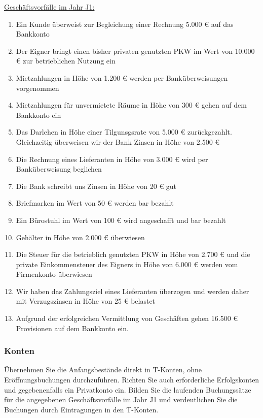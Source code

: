\documentclass[paper=a4, fontsize=11pt]{scrartcl}
\numberwithin{equation}{section}
\numberwithin{figure}{section}
\numberwithin{table}{section}
\begin{document}
\underline{Geschäftsvorfälle im Jahr J1:} 

\begin{enumerate}
\item Ein Kunde überweist zur Begleichung einer Rechnung 5.000 € auf das Bankkonto
\item Der Eigner bringt einen bisher privaten genutzten PKW im Wert von 10.000 € zur betrieblichen Nutzung ein
\item Mietzahlungen in Höhe von 1.200 € werden per Banküberweisungen vorgenommen
\item Mietzahlungen für unvermietete Räume in Höhe von 300 € gehen auf dem Bankkonto ein
\item Das Darlehen in Höhe einer Tilgunsgsrate von 5.000 € zurückgezahlt. Gleichzeitig überweisen wir der Bank Zinsen in Höhe von 2.500 €
\item Die Rechnung eines Lieferanten in Höhe von 3.000 € wird per Banküberweisung beglichen
\item Die Bank schreibt uns Zinsen in Höhe von 20 € gut
\item Briefmarken im Wert von 50 € werden bar bezahlt
\item Ein Bürostuhl im Wert von 100 € wird angeschafft und bar bezahlt
\item Gehälter in Höhe von 2.000 € überwiesen
\item Die Steuer für die betrieblich genutzten PKW in Höhe von 2.700 € und die private Einkommensteuer des Eigners in Höhe von 6.000 € werden vom Firmenkonto überwiesen
\item Wir haben das Zahlungsziel eines Lieferanten überzogen und werden daher mit Verzugszinsen in Höhe von 25 € belastet
\item Aufgrund der erfolgreichen Vermittlung von Geschäften gehen 16.500 € Provisionen auf dem Bankkonto ein.
\end{enumerate}


\subsubsection{Konten}

Übernehmen Sie die Anfangsbestände direkt in T-Konten, ohne Eröffnungsbuchungen durchzuführen. Richten Sie auch erforderliche Erfolgskonten und gegebenenfalls ein Privatkonto ein. Bilden Sie die laufenden Buchungssätze für die angegebenen Geschäftsvorfälle im Jahr J1 und verdeutlichen Sie die Buchungen durch Eintragungen in den T-Konten.
\end{document}
